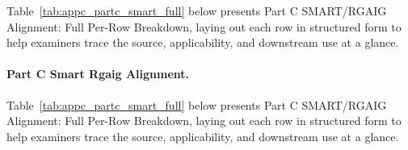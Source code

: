 {\tablestripes\tablefontsize

\noindent Table~\ref{tab:appc_partc_smart_full} below presents Part C SMART/RGAIG Alignment: Full Per-Row Breakdown, laying out each row in structured form to help examiners trace the source, applicability, and downstream use at a glance. %
\paragraph{Part C Smart Rgaig Alignment.} %
\noindent Table~\ref{tab:appc_partc_smart_full} below presents Part C SMART/RGAIG Alignment: Full Per-Row Breakdown, laying out each row in structured form to help examiners trace the source, applicability, and downstream use at a glance. %



}
